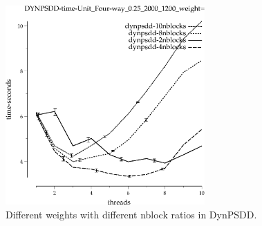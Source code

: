 \documentclass{article}
\begin{document}
\begin{appendices}
\begin{figure}[h!]
\includegraphics[width=3in]{../graphs/grid_unit_four-way_0.25_2000_1200/DYNPSDD-time-Unit_Four-way_0.25_2000_1200_weight=2.2.eps}
\caption{Different weights with different nblock ratios in DynPSDD.}
\label{fig:weight-grid}
\end{figure}


\end{appendices}
\end{document}
